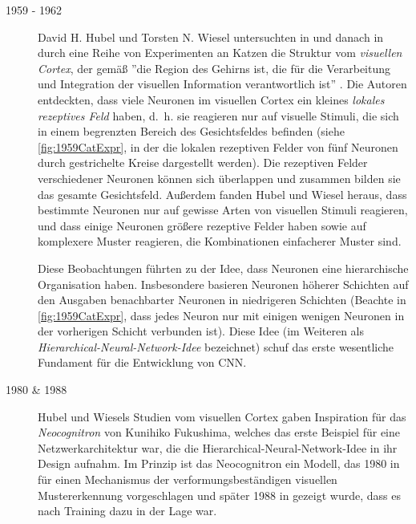 \begin{description}
	\item[1959 - 1962]
		
	David H. Hubel und Torsten N. Wiesel untersuchten in \cite{PMID:14403678,PMID:14403679} und danach in \cite{PMID:14449617} durch eine Reihe von Experimenten an Katzen die Struktur vom \emph{visuellen Cortex}, der gemäß \cite{Bergua2017} ''die Region des Gehirns ist, die für die Verarbeitung und Integration der visuellen Information verantwortlich ist'' . Die Autoren entdeckten, dass viele Neuronen im visuellen Cortex ein kleines \emph{lokales rezeptives Feld} haben, d.~h. sie reagieren nur auf visuelle Stimuli, die sich in einem begrenzten Bereich des Gesichtsfeldes befinden (siehe \autoref{fig:1959CatExpr}, in der die lokalen rezeptiven Felder von fünf Neuronen durch gestrichelte Kreise dargestellt werden). Die rezeptiven Felder verschiedener Neuronen können sich überlappen und zusammen bilden sie das gesamte Gesichtsfeld. Außerdem fanden Hubel und Wiesel heraus, dass bestimmte Neuronen nur auf gewisse Arten von visuellen Stimuli reagieren, und dass einige Neuronen größere rezeptive Felder haben sowie auf komplexere Muster reagieren, die Kombinationen einfacherer Muster sind. 
	
	Diese Beobachtungen führten zu der Idee, dass Neuronen eine hierarchische Organisation haben. Insbesondere basieren Neuronen höherer Schichten auf den Ausgaben benachbarter Neuronen in niedrigeren Schichten (Beachte in \autoref{fig:1959CatExpr}, dass jedes Neuron nur mit einigen wenigen Neuronen in der vorherigen Schicht verbunden ist). Diese Idee (im Weiteren als \emph{Hierarchical-Neural-Network-Idee} bezeichnet) schuf das erste wesentliche Fundament für die Entwicklung von CNN.
		
	\item[1980 \& 1988] 
	
	Hubel und Wiesels Studien vom visuellen Cortex gaben Inspiration für das \emph{Neocognitron} von Kunihiko Fukushima, welches das erste Beispiel für eine Netzwerkarchitektur war, die die Hierarchical-Neural-Network-Idee in ihr Design aufnahm. Im Prinzip ist das Neocognitron ein Modell, das 1980 in \cite{Neocognitron1980} für einen Mechanismus der verformungsbeständigen visuellen Mustererkennung vorgeschlagen und später 1988 in \cite{Neocognitron1988} gezeigt wurde, dass es nach Training dazu in der Lage war.
	

\end{description}
